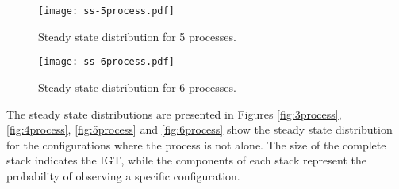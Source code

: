 \begin{figure}
    \centering
    \texttt{[image: ss-5process.pdf]}
    \caption{Steady state distribution for 5 processes.}
    \label{fig:ss-5process}
\end{figure}

\begin{figure}
    \centering
    \texttt{[image: ss-6process.pdf]}
    \caption{Steady state distribution for 6 processes.}
    \label{fig:ss-6process}
\end{figure}

The steady state distributions are presented in Figures \ref{fig:3process}, \ref{fig:4process}, \ref{fig:5process} and \ref{fig:6process} show the steady state distribution for the configurations where the process is not alone.
The size of the complete stack indicates the IGT, while the components of each stack represent the probability of observing a specific configuration.
